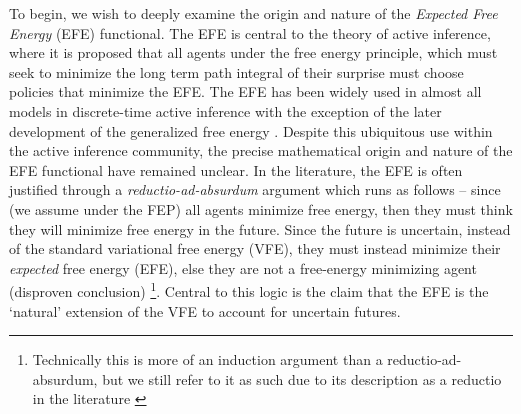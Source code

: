 To begin, we wish to deeply examine the origin and nature of the \emph{Expected Free Energy} (EFE) functional. The EFE is central to the theory of active inference, where it is proposed that all agents under the free energy principle, which must seek to minimize the long term path integral of their surprise must choose policies that minimize the EFE. The EFE has been widely used in almost all models in discrete-time active inference \citep{friston_active_2015,friston2017active,friston2018deep,friston2017process,da2020active} with the exception of the later development of the generalized free energy \citep{friston2015active,parr2017uncertainty,parr2017active}.%
  Despite this ubiquitous use within the active inference community, the precise mathematical origin and nature of the EFE functional have remained unclear. In the literature, the EFE is often justified through a \emph{reductio-ad-absurdum} argument \citep{friston2015active} which runs as follows -- since (we assume under the FEP) all agents minimize free energy, then they must think they will minimize free energy in the future. Since the future is uncertain, instead of the standard variational free energy (VFE), they must instead minimize their \emph{expected} free energy (EFE), else they are not a free-energy minimizing agent (disproven conclusion) \footnote{Technically this is more of an induction argument than a reductio-ad-absurdum, but we still refer to it as such due to its description as a reductio in the literature \citep{friston2015active}}. Central to this logic is the claim that the EFE is the `natural' extension of the VFE to account for uncertain futures. 

